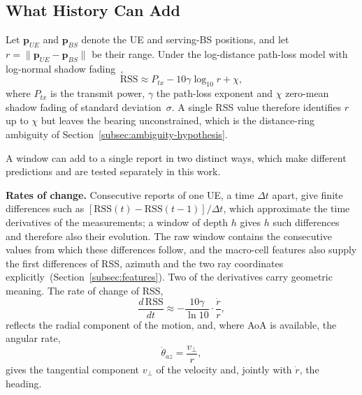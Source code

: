 \subsection{What History Can Add}
\label{subsec:history-dof}
Let $\mathbf{p}_{UE}$ and $\mathbf{p}_{BS}$ denote the UE and serving-BS positions, and let $r = \lVert \mathbf{p}_{UE} - \mathbf{p}_{BS} \rVert$ be their range. Under the log-distance path-loss model with log-normal shadow fading~\cite{italiano2025tutorial,3gpp38901},
\begin{equation}
  \mathrm{RSS} \approx P_{tx} - 10\gamma\log_{10} r + \chi,
  \label{eq:path-loss}
\end{equation}
where $P_{tx}$ is the transmit power, $\gamma$ the path-loss exponent and $\chi$ zero-mean shadow fading of standard deviation~$\sigma$. A single RSS value therefore identifies $r$ up to $\chi$ but leaves the bearing unconstrained, which is the distance-ring ambiguity of Section~\ref{subsec:ambiguity-hypothesis}.

A window can add to a single report in two distinct ways, which make different predictions and are tested separately in this work.

\noindent\textbf{Rates of change.} Consecutive reports of one UE, a time $\Delta t$ apart, give finite differences such as $[\mathrm{RSS}(t)-\mathrm{RSS}(t-1)]/\Delta t$, which approximate the time derivatives of the measurements; a window of depth $h$ gives $h$ such differences and therefore also their evolution. The raw window contains the consecutive values from which these differences follow, and the macro-cell features also supply the first differences of RSS, azimuth and the two ray coordinates explicitly~(Section~\ref{subsec:features}). Two of the derivatives carry geometric meaning. The rate of change of RSS,
\begin{equation}
  \frac{d\,\mathrm{RSS}}{dt} \approx -\frac{10\gamma}{\ln 10} \cdot \frac{\dot r}{r},
  \label{eq:drss-dt}
\end{equation}
reflects the radial component of the motion, and, where AoA is available, the angular rate,
\begin{equation}
  \dot\theta_{az} = \frac{v_\perp}{r},
  \label{eq:dtheta-dt}
\end{equation}
gives the tangential component $v_\perp$ of the velocity and, jointly with $\dot r$, the heading.

